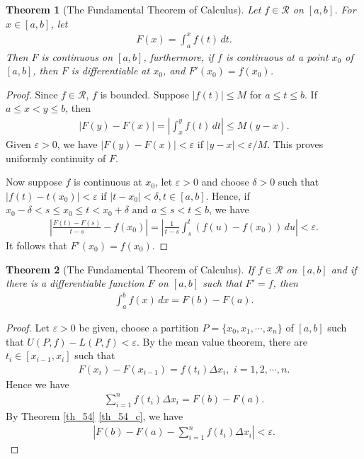 \documentclass[10pt]{book}
\newtheorem{theorem}{Theorem}[chapter]
\theoremstyle{definition}
\numberwithin{equation}{chapter}
\begin{document}
\begin{theorem}[The Fundamental Theorem of Calculus]
Let $f \in \mathscr{R}$ on $[a,b]$. For $x \in [a,b]$, let
\begin{align*}
    F(x) = \int^x_a f(t) \,dt.
\end{align*}
Then $F$ is continuous on $[a,b]$, furthermore, if $f$ is continuous at a point $x_0$ of $[a,b]$, then $F$ is differentiable at $x_0$, and $F'(x_0) = f(x_0)$.
\end{theorem}
\begin{proof}
Since $f \in \mathscr{R}$, $f$ is bounded. Suppose $\left|f(t)\right| \leq M$ for $a \leq t \leq b$. If $a \leq x < y \leq b$, then
\begin{align*}
    \left|F(y) - F(x)\right| = \left|\int^y_x f(t) \,dt\right| \leq M(y - x).
\end{align*}
Given $\varepsilon > 0$, we have $\left|F(y) - F(x)\right| < \varepsilon$ if $\left|y - x\right| < \varepsilon/M$. This proves uniformly continuity of $F$.

Now suppose $f$ is continuous at $x_0$, let $\varepsilon > 0$ and choose $\delta > 0$ such that $\left|f(t) - t(x_0)\right| < \varepsilon$ if $\left|t - x_0\right| < \delta, t \in [a,b]$. Hence, if $x_0 - \delta < s \leq x_0 \leq t < x_0 + \delta$ and $a \leq s < t \leq b$, we have
\begin{align*}
    \left|\frac{F(t) - F(s)}{t - s} - f(x_0)\right| = \left|\frac{1}{t - s} \int^t_s (f(u) - f(x_0)) \,du \right| < \varepsilon.
\end{align*}
It follows that $F'(x_0) = f(x_0)$.
\end{proof}

\medskip

\begin{theorem}[The Fundamental Theorem of Calculus]\label{th_516}
If $f \in \mathscr{R}$ on $[a,b]$ and if there is a differentiable function $F$ on $[a,b]$ such that $F' = f$, then
\begin{align*}
    \int^b_a f(x) \,dx = F(b) - F(a).
\end{align*}
\end{theorem}
\begin{proof}
Let $\varepsilon > 0$ be given, choose a partition $P = \{x_0,x_1,\cdots,x_n\}$ of $[a,b]$ such that $U(P,f) - L(P,f) < \varepsilon$. By the mean value theorem, there are $t_i \in [x_{i-1},x_i]$ such that 
\begin{align*}
    F(x_i) - F(x_{i-1}) = f(t_i) \Delta x_i, \,\, i = 1,2,\cdots,n.
\end{align*}
Hence we have 
\begin{align*}
    \sum^n_{i=1} f(t_i) \Delta x_i = F(b) - F(a).
\end{align*}
By Theorem \ref{th_54} \ref{th_54_c}, we have
\begin{align*}
    \left|F(b) - F(a) - \sum^n_{i=1} f(t_i) \Delta x_i \right| < \varepsilon.
\end{align*}
\end{proof}
\end{document}

